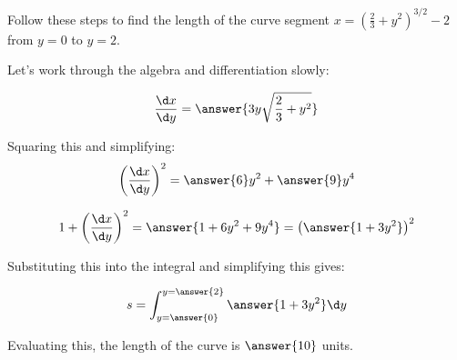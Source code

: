 \documentclass{ximera}
\author{Jim Talamo}
\begin{document}
\begin{exercise}

Follow these steps to find the length of the curve segment $x=\left(\frac{2}{3}+y^2\right)^{3/2} -2$ from $y=0$ to $y=2$.

Let's work through the algebra and differentiation slowly:

\[
\frac{\d x}{\d y} = \answer{3y\sqrt{\frac{2}{3}+y^2}}
\]
\begin{exercise}
Squaring this and simplifying:
\[
\left(\frac{\d x}{\d y}\right)^2 = \answer{6}y^2+\answer{9}y^4
\]

\begin{exercise}

\[
1+ \left(\frac{\d x}{\d y}\right)^2 = \answer{1+6y^2+9y^4} = \left(\answer{1+3y^2}  \right)^2
\]

\begin{exercise}
Substituting this into the integral and simplifying this gives:

\[
s= \int_{y=\answer{0}}^{y=\answer{2}} \answer{1+3y^2} \d y 
\]

Evaluating this, the length of the curve is $\answer{10 }$ units.

\end{exercise}
\end{exercise}
\end{exercise}



\end{exercise}
\end{document}
